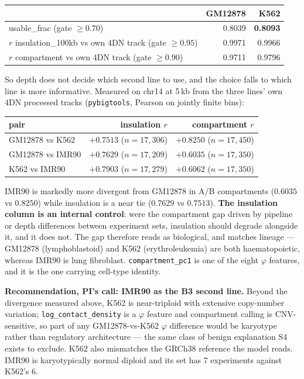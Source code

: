 \documentclass[11pt,a4paper]{article}
\newcommand{\code}[1]{\texttt{\small #1}}
\begin{document}
\begin{center}
\begin{tabular}{lrr}
\hline
 & GM12878 & K562 \\
\hline
usable\_frac (gate $\geq 0.70$) & 0.8039 & \textbf{0.8093} \\
$r$ insulation\_100kb vs own 4DN track (gate $\geq 0.95$) & 0.9971 & 0.9966 \\
$r$ compartment vs own 4DN track (gate $\geq 0.90$) & 0.9711 & 0.9796 \\
\hline
\end{tabular}
\end{center}

So depth does not decide which second line to use, and the choice falls to
which line is more informative. Measured on chr14 at 5\,kb from the three
lines' own 4DN processed tracks (\code{pybigtools}, Pearson on jointly finite
bins):

\begin{center}
\begin{tabular}{lrr}
\hline
pair & insulation $r$ & compartment $r$ \\
\hline
GM12878 vs K562  & $+0.7513$ ($n{=}17{,}306$) & $+0.8250$ ($n{=}17{,}450$) \\
GM12878 vs IMR90 & $+0.7629$ ($n{=}17{,}209$) & $\mathbf{+0.6035}$ ($n{=}17{,}350$) \\
K562 vs IMR90    & $+0.7903$ ($n{=}17{,}279$) & $+0.6062$ ($n{=}17{,}350$) \\
\hline
\end{tabular}
\end{center}

IMR90 is markedly more divergent from GM12878 in A/B compartments
($0.6035$ vs $0.8250$) while insulation is a near tie ($0.7629$ vs $0.7513$).
\textbf{The insulation column is an internal control}: were the compartment gap
driven by pipeline or depth differences between experiment sets, insulation
should degrade alongside it, and it does not. The gap therefore reads as
biological, and matches lineage --- GM12878 (lymphoblastoid) and K562
(erythroleukemia) are both haematopoietic, whereas IMR90 is lung fibroblast.
\code{compartment\_pc1} is one of the eight $\varphi$ features, and it is the
one carrying cell-type identity.

\textbf{Recommendation, PI's call: IMR90 as the B3 second line.} Beyond the
divergence measured above, K562 is near-triploid with extensive copy-number
variation; \code{log\_contact\_density} is a $\varphi$ feature and compartment
calling is CNV-sensitive, so part of any GM12878-vs-K562 $\varphi$ difference
would be karyotype rather than regulatory architecture --- the same class of
benign explanation S4 exists to exclude. K562 also mismatches the GRCh38
reference the model reads. IMR90 is karyotypically normal diploid and its set
has 7 experiments against K562's 6.
\end{document}

